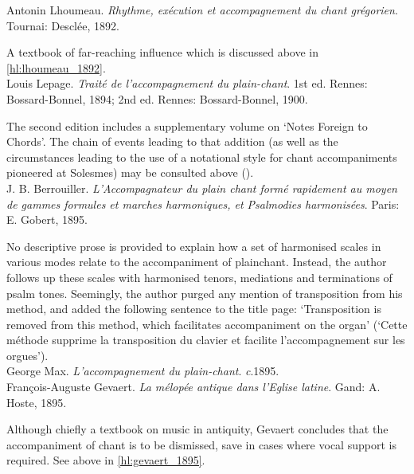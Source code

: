     \parindent=0pt
    \hangindent=0pt
  Antonin Lhoumeau. \emph{Rhythme, exécution et accompagnement du chant grégorien}. Tournai:  Desclée, 1892.

     \parindent=20pt
     \hangindent=20pt
     A textbook of far-reaching influence which is discussed above in \cref{hl:lhoumeau_1892}.\\

    \parindent=0pt
    \hangindent=0pt
  Louis Lepage. \emph{Traité de l'accompagnement du plain-chant}. 1st ed. Rennes:  Bossard-Bonnel, 1894;  2nd ed. Rennes:  Bossard-Bonnel, 1900.

     \parindent=20pt
     \hangindent=20pt
     The second edition includes a supplementary volume on `Notes Foreign to Chords'. The chain of events leading to that addition (as well as the circumstances leading to the use of a notational style for chant accompaniments pioneered at Solesmes) may be consulted above ().\\

    \parindent=0pt
    \hangindent=0pt
  J. B. Berrouiller. \emph{ L'Accompagnateur du plain chant formé rapidement au moyen de gammes formules et marches harmoniques, et Psalmodies harmonisées}. Paris:  E. Gobert, 1895.

     \parindent=20pt
     \hangindent=20pt
     No descriptive prose is provided to explain how a set of harmonised scales in various modes relate to the accompaniment of plainchant. Instead, the author follows up these scales with harmonised tenors, mediations and terminations of psalm tones. Seemingly, the author purged any mention of transposition from his method, and added the following sentence to the title page: `Transposition is removed from this method, which facilitates accompaniment on the organ' (`Cette méthode supprime la transposition du clavier et facilite l'accompagnement sur les orgues').\\

    \parindent=0pt
    \hangindent=0pt
  \covid{}George Max. \emph{L'accompagnement du plain-chant}. \emph{c}.1895. \\

    \parindent=0pt
    \hangindent=0pt
  François-Auguste Gevaert. \emph{La mélopée antique dans l'Eglise latine}. Gand:  A. Hoste, 1895.

     \parindent=20pt
     \hangindent=20pt
     Although chiefly a textbook on music in antiquity, Gevaert concludes that the accompaniment of chant is to be dismissed, save in cases where vocal support is required. See above in \cref{hl:gevaert_1895}.\\

